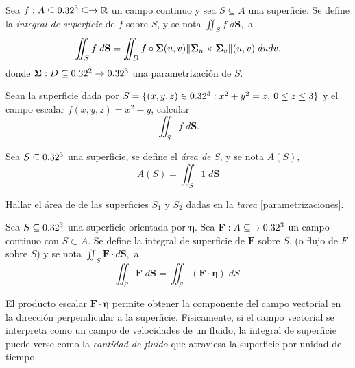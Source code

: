\begin{definition}Sea $f:A \subseteq0.32^3  \subseteq  \to\mathbb{R}$  un campo continuo y sea $S\subseteq A$ una superficie.  Se define la \emph{ integral de superficie} de $f$ sobre $S$, y se nota  $\iint_S f  \;d\mathbf{S},$ a
    \[
        \iint_S f \;d\mathbf{S}=  \iint_D  f  \circ\boldsymbol{\Sigma}(u,v) \norm{\boldsymbol{\Sigma}_u\times\boldsymbol{\Sigma}_v}(u,v) \;dudv .
    \] donde $\boldsymbol{\Sigma}:D\subseteq0.32^2 \to0.32^3$ una parametrizaci\'on de $S$.
\end{definition} 





\begin{tarea}  Sean  la superficie dada por $S=\{ (x,y,z) \in 0.32^3:  x^{2}+y^{2} =z, \: 0\leq z \leq 3 \}$ y el campo escalar $f(x,y,z) = x^{2}-y$, calcular  $$   \iint_S f \;d\mathbf{S}. $$
\end{tarea} 


\begin{definition} Sea $S\subseteq 0.32^3$ una superficie, se define el \emph{ \'area de } $S$, y se nota $A(S)$,  $$A(S) =  \iint_S  1 \;d\mathbf{S}$$
\end{definition}

\begin{tarea} Hallar el \'area de  de las superficies $S_1$ y $S_2$  dadas  en la \emph{tarea} \ref{parametrizaciones}.
\end{tarea}





\begin{definition}
    Sea $S\subseteq0.32^3$ una superficie orientada por $\boldsymbol{\eta}$. Sea $\mathbf{F}:A  \subseteq  \to0.32^3$  un campo continuo con $S\subset A$. Se define la integral de superficie de $\mathbf{F}$ sobre $S$, (o flujo de $F$ sobre $S$) y se nota  $\iint_S\mathbf{F}\cdot d\mathbf{S},$ a
    \[
        \iint_S \mathbf{F}\;d\mathbf{S}=\iint_S (\mathbf{F}\cdot\boldsymbol{\eta}) \;dS.
    \]
\end{definition} 



\begin{obs}
El producto escalar $\mathbf{F}\cdot\boldsymbol{\eta}$  permite obtener la componente del campo vectorial en la direcci\'on perpendicular a la superficie. Fisicamente, si el campo vectorial se interpreta como un campo de velocidades de un fluido, la integral de superficie puede verse como la \emph{cantidad de fluido} que atraviesa la superficie por unidad de tiempo.
\end{obs}



